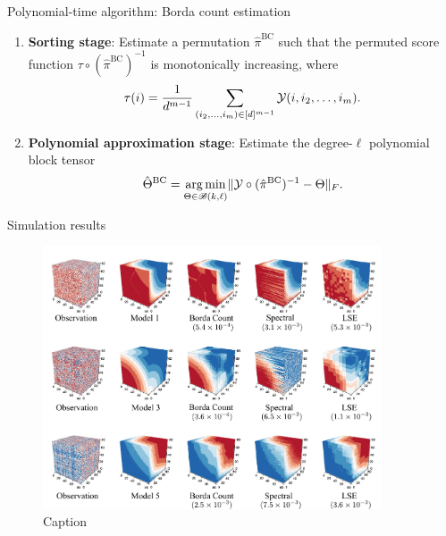 \documentclass[aspectratio=169,xcolor=dvipsnames]{beamer}
\def\caliB{\mathscr{B}}
\begin{document}
\begin{frame}{Polynomial-time algorithm: Borda count estimation}
\begin{enumerate}
  \item {\bf Sorting stage}: Estimate a permutation $\hat\pi^{\text{BC}}$  such that the permuted score function $\tau\circ (\hat\pi^{\text{BC}})^{-1}$ is monotonically increasing, where \[\tau(i) = \frac{1}{d^{m-1}}\sum_{(i_2,\ldots,i_m)\in[d]^{m-1}} \mathcal{Y}(i,i_2,\ldots,i_m).\] 
 \item {\bf Polynomial approximation stage}: Estimate the degree-$\ell$ polynomial block tensor
    \begin{align}\label{eq:bclse}
        \hat\Theta^{\text{BC}} = \argmin_{\Theta\in\caliB(k,\ell)}\FnormSize{}{\tY\circ(\hat\pi^{\text{BC}})^{-1}-\Theta}.
    \end{align}
    \end{enumerate}
\vspace{-.5cm}
\end{frame}

\begin{frame}{Simulation results}
\begin{figure}
    \centering
    \includegraphics[width = 10cm]{figure/vfinal.pdf}
    \caption{Caption}
    \label{fig:my_label}
\end{figure}
    
\end{frame}
\end{document}
